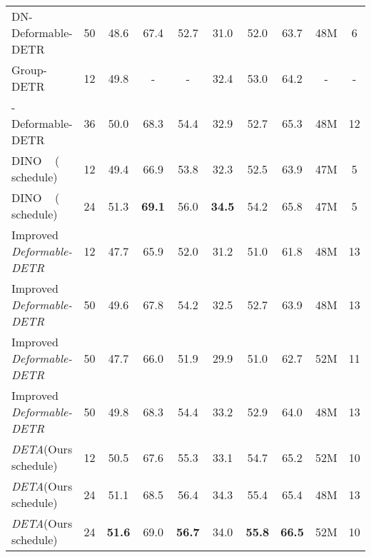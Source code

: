 \documentclass[10pt,twocolumn,letterpaper]{article}
\newcommand{\nmsdets}{{NMS-based detectors\xspace}}
\newcommand{\ddetr}{{\textit{Deformable-DETR}}\xspace}
\newcommand{\lbltbl}[1]{\label{tbl:#1}}
\def\name{{\textit{DETA}}\xspace}
\begin{document}
\begin{table*}[ht]
\begin{tabular}{@{}l@{\ }c@{\ \ \ \ }c@{\ \ \ \ }c@{\ \ \ \ }c@{\ \ \ \ }c@{\ \ \ \ }c@{\ \ \ \ }c@{\ \ \ }c@{\ \ \ }c@{}}
DN-Deformable-DETR~\cite{li2022dn} & 50 & 48.6 & 67.4 & 52.7 & 31.0 & 52.0 & 63.7 & 48M & 6 \\
Group-DETR~\cite{chen2022group} & 12 & 49.8 & - & - & 32.4 & 53.0 & 64.2 & - & - \\
-Deformable-DETR~\cite{jia2022detrs} & 36 & 50.0 & 68.3 & 54.4 & 32.9 & 52.7 & 65.3 & 48M & 12 \\
DINO ~\cite{zhang2022dino} ( schedule) & 12 & 49.4 & 66.9 & 53.8 & 32.3 & 52.5 & 63.9 & 47M & 5 \\
DINO ~\cite{zhang2022dino} ( schedule) & 24 & 51.3 & \textbf{69.1} & 56.0 & \textbf{34.5} & 54.2 & 65.8 & 47M & 5\\ \midrule
Improved \ddetr{}~\cite{zhu2020deformable}  & 12 & 47.7 & 65.9 & 52.0 & 31.2 & 51.0 & 61.8 & 48M & 13 \\
Improved \ddetr{}~\cite{zhu2020deformable}  & 50 & 49.6 & 67.8 & 54.2 & 32.5 & 52.7 & 63.9 & 48M & 13 \\
Improved \ddetr{}~\cite{zhu2020deformable}  & 50 & 47.7 & 66.0 & 51.9 & 29.9 & 51.0 & 62.7 & 52M & 11 \\
Improved \ddetr{}~\cite{zhu2020deformable}  & 50 & 49.8 & 68.3 & 54.4 & 33.2 & 52.9 & 64.0 & 48M & 13 \\
\name (Ours  schedule)  & 12 & 50.5 & 67.6 & 55.3 & 33.1 & 54.7 & 65.2 & 52M & 10 \\
\name (Ours  schedule)  & 24 & 51.1 & 68.5 & 56.4 & 34.3 & 55.4 & 65.4 & 48M & 13 \\
\name (Ours  schedule) & 24 & \textbf{51.6} & 69.0 & \textbf{56.7} & 34.0 & \textbf{55.8} & \textbf{66.5} & 52M & 10 \\

\bottomrule
\end{tabular}
\caption{
\textbf{System-level Comparisons to prior work on COCO validation with ResNet50 backbone.}
For each detector, we list the number of training epochs, detection accuracy, number of model parameters and frames-per-second (FPS).
FPS was measured on the same V100 machine whenever possible. Italic FPS were copied from the original publication.
Top block: traditional \nmsdets;
Middle block: transformer-based end-to-end object detectors.
Bottom block: our transformer-based and NMS-based detector.
\name enjoys the best of both worlds.
It trains as fast as NMS-based detectors and achieves performance competitive with transformer-based detectors.
Methods with  are evaluated with the top 300 predictions.
Methods with  use 9 encoder layers.
}
\lbltbl{r50}
\end{table*}
\end{document}
